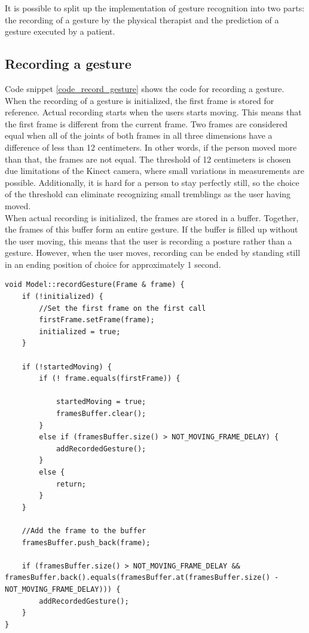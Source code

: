 It is possible to split up the implementation of gesture recognition into two parts: the recording of a gesture by the physical therapist and the prediction of a gesture executed by a patient.


\subsection{Recording a gesture}

Code snippet \ref{code_record_gesture} shows the code for recording a gesture. When the recording of a gesture is initialized, the first frame is stored for reference. Actual recording starts when the users starts moving. This means that the first frame is different from the current frame. Two frames are considered equal when all of the joints of both frames in all three dimensions have a difference of less than 12 centimeters. In other words, if the person moved more than that, the frames are not equal. The threshold of 12 centimeters is chosen due limitations of the Kinect camera, where small variations in measurements are possible. Additionally, it is hard for a person to stay perfectly still, so the choice of the threshold can eliminate recognizing small tremblings as the user having moved.\\

When actual recording is initialized, the frames are stored in a buffer. Together, the frames of this buffer form an entire gesture. If the buffer is filled up without the user moving, this means that the user is recording a posture rather than a gesture. However, when the user moves, recording can be ended by standing still in an ending position of choice for approximately 1 second.\\

\begin{lstlisting}[caption=method to record a gesture, label=code_record_gesture]
void Model::recordGesture(Frame & frame) {
	if (!initialized) {
		//Set the first frame on the first call
		firstFrame.setFrame(frame);
		initialized = true;
	}

	if (!startedMoving) {
		if (! frame.equals(firstFrame)) {
		
			startedMoving = true;
			framesBuffer.clear();
		}
		else if (framesBuffer.size() > NOT_MOVING_FRAME_DELAY) {
			addRecordedGesture();
		}
		else {
			return;
		}
	}
	
	//Add the frame to the buffer
	framesBuffer.push_back(frame);

	if (framesBuffer.size() > NOT_MOVING_FRAME_DELAY &&	framesBuffer.back().equals(framesBuffer.at(framesBuffer.size() - NOT_MOVING_FRAME_DELAY))) {
		addRecordedGesture();
	}
}
\end{lstlisting}


